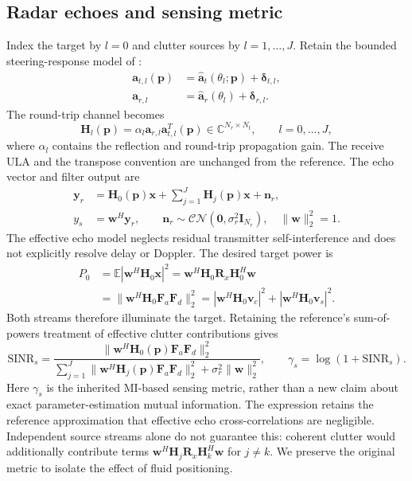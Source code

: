 \documentclass[11pt]{article}
\newcommand{\Fa}{\mathbf F_a}
\newcommand{\Fd}{\mathbf F_d}
\newcommand{\pos}{\mathbf p}
\begin{document}
\subsection{Radar echoes and sensing metric}
Index the target by $l=0$ and clutter sources by $l=1,\ldots,J$. Retain the
bounded steering-response model of \cite{wang2026}:
\begin{align}
 \mathbf a_{t,l}(\pos)&=
 \widehat{\mathbf a}_t(\theta_l;\pos)+\bm\delta_{t,l},\\
 \mathbf a_{r,l}&=\widehat{\mathbf a}_r(\theta_l)+\bm\delta_{r,l}.
\end{align}
The round-trip channel becomes
\begin{equation}
 \mathbf H_l(\pos)=\alpha_l\mathbf a_{r,l}\mathbf a_{t,l}^T(\pos)
 \in\mathbb C^{N_r\times N_t},\qquad l=0,\ldots,J,
 \label{eq:radarchannel}
\end{equation}
where $\alpha_l$ contains the reflection and round-trip propagation gain.
The receive ULA and the transpose convention are unchanged from the reference.
The echo vector and filter output are
\begin{align}
 \mathbf y_r&=\mathbf H_0(\pos)\mathbf x
 +\sum_{j=1}^{J}\mathbf H_j(\pos)\mathbf x+\mathbf n_r,\\
 y_s&=\mathbf w^H\mathbf y_r,\qquad
 \mathbf n_r\sim\mathcal{CN}(\mathbf0,\sigma_r^2\mathbf I_{N_r}),
 \quad \|\mathbf w\|_2^2=1.
\end{align}
The effective echo model neglects residual transmitter self-interference and
does not explicitly resolve delay or Doppler. The desired target power is
\begin{align}
 P_0&=\mathbb E|\mathbf w^H\mathbf H_0\mathbf x|^2
 =\mathbf w^H\mathbf H_0\mathbf R_x\mathbf H_0^H\mathbf w\\
 &=\|\mathbf w^H\mathbf H_0\Fa\Fd\|_2^2
 =|\mathbf w^H\mathbf H_0\mathbf v_c|^2
  +|\mathbf w^H\mathbf H_0\mathbf v_s|^2.
\end{align}
Both streams therefore illuminate the target. Retaining the reference's
sum-of-powers treatment of effective clutter contributions gives
\begin{equation}
 \mathrm{SINR}_s=
 \frac{\|\mathbf w^H\mathbf H_0(\pos)\Fa\Fd\|_2^2}
 {\sum_{j=1}^{J}\|\mathbf w^H\mathbf H_j(\pos)\Fa\Fd\|_2^2
  +\sigma_r^2\|\mathbf w\|_2^2},
 \qquad \gamma_s=\log(1+\mathrm{SINR}_s).
 \label{eq:sensingsinr}
\end{equation}
Here $\gamma_s$ is the inherited MI-based sensing metric, rather than a new
claim about exact parameter-estimation mutual information. The expression
retains the reference approximation that effective echo cross-correlations
are negligible. Independent source streams alone do not guarantee this:
coherent clutter would additionally contribute terms
$\mathbf w^H\mathbf H_j\mathbf R_x\mathbf H_k^H\mathbf w$ for $j\ne k$.
We preserve the original metric to isolate the effect of fluid positioning.
\end{document}
